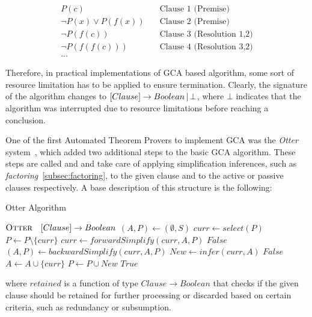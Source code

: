 \begin{equation}
   \begin{aligned}
    P(c) &\quad \text{Clause 1 (Premise)} \\
    \neg P(x) \lor P(f(x)) &\quad \text{Clause 2 (Premise)} \\
    \neg P(f(c)) &\quad \text{Clause 3 (Resolution 1,2)} \\
    \neg P(f(f(c))) &\quad \text{Clause 4 (Resolution 3,2)} \\
    \ldots
  \end{aligned}
\end{equation}

Therefore, in practical implementations of GCA based algorithm, some sort of resource limitation has to be applied to ensure termination.
Clearly, the signature of the algorithm changes to \([Clause] \to Boolean \,|\, \bot\), where \(\bot\) indicates that the algorithm was interrupted due to resource limitations before reaching a conclusion.

One of the first Automated Theorem Provers to implement GCA was the \emph{Otter} system~\cite{mccune1994otter},  which added two additional steps to the basic GCA algorithm.
These steps are called  and  and take care of applying simplification inferences, such as \emph{factoring}~\ref{subsec:factoring}, to the given clause and to the active or passive clauses respectively.
A base description of this structure is the following:
\begin{algorithm}[H]
    \caption{Otter Algorithm}\label{alg:otter-algorithm}
    \begin{algorithmic}[1]
        \Statex{}  \(\textsc{Otter} \quad [Clause] \to Boolean\)
            \State{} \((A,P)\gets (\emptyset,S)\)
                \State{} \(curr \gets select(P)\)
                \State{} \(P \gets P \setminus \{curr\}\)
                    \State{} \(curr \gets forwardSimplify(curr,A,P)\)
                        \State{}  \(False\)
                    \EndIf{}
                        \State{} \((A,P) \gets backwardSimplify(curr,A,P)\)
                        \State{} \(New \gets infer(curr, A)\)
                            \State{}  \(False\)
                        \EndIf{}
                        \State{} \(A \gets A \cup \{curr\}\)
                        \State{} \(P \gets P \cup New\)
                    \EndIf{}
                \EndIf{}
            \EndWhile{}
            \State{}  \(True\)
        \EndFunction{}
    \end{algorithmic}
\end{algorithm}
where \(retained\) is a function of type \(Clause \to Boolean\) that checks if the given clause should be retained for further processing or discarded based on certain criteria, such as redundancy or subsumption.

